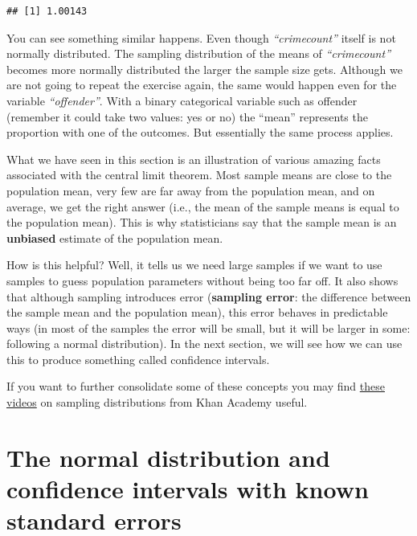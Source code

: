 \documentclass[
]{book}
\begin{document}
\begin{verbatim}
## [1] 1.00143
\end{verbatim}

You can see something similar happens. Even though \emph{``crimecount''} itself is not normally distributed. The sampling distribution of the means of \emph{``crimecount''} becomes more normally distributed the larger the sample size gets. Although we are not going to repeat the exercise again, the same would happen even for the variable \emph{``offender''}. With a binary categorical variable such as offender (remember it could take two values: yes or no) the ``mean'' represents the proportion with one of the outcomes. But essentially the same process applies.

What we have seen in this section is an illustration of various amazing facts associated with the central limit theorem. Most sample means are close to the population mean, very few are far away from the population mean, and on average, we get the right answer (i.e., the mean of the sample means is equal to the population mean). This is why statisticians say that the sample mean is an \textbf{unbiased} estimate of the population mean.

How is this helpful? Well, it tells us we need large samples if we want to use samples to guess population parameters without being too far off. It also shows that although sampling introduces error (\textbf{sampling error}: the difference between the sample mean and the population mean), this error behaves in predictable ways (in most of the samples the error will be small, but it will be larger in some: following a normal distribution). In the next section, we will see how we can use this to produce something called confidence intervals.

If you want to further consolidate some of these concepts you may find \href{https://www.khanacademy.org/math/probability/statistics-inferential/sampling_distribution/v/central-limit-theorem}{these videos} on sampling distributions from Khan Academy useful.

\hypertarget{the-normal-distribution-and-confidence-intervals-with-known-standard-errors}{%
\section{The normal distribution and confidence intervals with known standard errors}\label{the-normal-distribution-and-confidence-intervals-with-known-standard-errors}}
\end{document}
